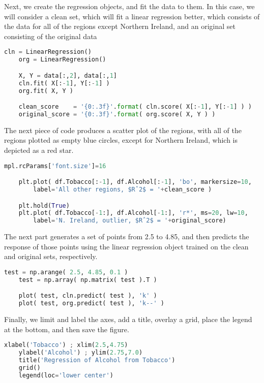 Next, we create the regression objects, and fit the data to them. In this case, we will consider a clean set, which will fit a linear regression better, which consists of the data for all of the regions except Northern Ireland, and an original set consisting of the original data

\begin{lstlisting}[language=Python]	
    cln = LinearRegression()
    org = LinearRegression()

    X, Y = data[:,2], data[:,1]
    cln.fit( X[:-1], Y[:-1] )
    org.fit( X, Y )

    clean_score    = '{0:.3f}'.format( cln.score( X[:-1], Y[:-1] ) )
    original_score = '{0:.3f}'.format( org.score( X, Y ) )
\end{lstlisting}

The next piece of code produces a scatter plot of the regions, with all of the regions plotted as empty blue circles, except for Northern Ireland, which is depicted as a red star.

\begin{lstlisting}[language=Python]
    mpl.rcParams['font.size']=16

    plt.plot( df.Tobacco[:-1], df.Alcohol[:-1], 'bo', markersize=10,
        label='All other regions, $Rˆ2$ = '+clean_score )

    plt.hold(True)
    plt.plot( df.Tobacco[-1:], df.Alcohol[-1:], 'r*', ms=20, lw=10,
        label='N. Ireland, outlier, $Rˆ2$ = '+original_score)
\end{lstlisting}

The next part generates a set of points from 2.5 to 4.85, and then predicts the response of those points using the linear regression object trained on the clean and original sets, respectively.

\begin{lstlisting}[language=Python]
    test = np.arange( 2.5, 4.85, 0.1 )
    test = np.array( np.matrix( test ).T )

    plot( test, cln.predict( test ), 'k' )
    plot( test, org.predict( test ), 'k--' )
\end{lstlisting}

Finally, we limit and label the axes, add a title, overlay a grid, place the legend at the bottom, and then save the figure.

\begin{lstlisting}[language=Python]
    xlabel('Tobacco') ; xlim(2.5,4.75)
    ylabel('Alcohol') ; ylim(2.75,7.0)
    title('Regression of Alcohol from Tobacco')
    grid()
    legend(loc='lower center')
\end{lstlisting}

